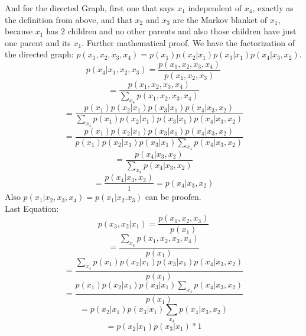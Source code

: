 And for the directed Graph, first one that says $x_1$ independent of $x_4$, exactly as the definition from above, and that $x_2$ and $x_3$ are the Markov blanket of $x_1$, because $x_1$ has 2 children and no other parents and also those children have just one parent and its $x_1$. 
Further mathematical proof. We have the factorization of the directed graph: $ p(x_1,x_2,x_3,x_4) = p(x_1)p(x_2|x_1)p(x_3|x_1)p(x_4|x_3, x_2)$.
$$p(x_4|x_1,x_2,x_3) = \frac{p(x_1,x_2,x_3,x_4)}{p(x_1,x_2,x_3)}$$
$$ = \frac{p(x_1,x_2,x_3,x_4)}{\sum_{x_4} p(x_1,x_2,x_3, x_4)}$$
$$ = \frac{p(x_1)p(x_2|x_1)p(x_3|x_1)p(x_4|x_3, x_2)}{\sum_{x_4}p(x_1)p(x_2|x_1)p(x_3|x_1)p(x_4|x_3, x_2)}$$
$$ = \frac{p(x_1)p(x_2|x_1)p(x_3|x_1)p(x_4|x_3, x_2)}{p(x_1)p(x_2|x_1)p(x_3|x_1)\sum_{x_4}p(x_4|x_3, x_2)}$$
$$ = \frac{p(x_4|x_3, x_2)}{\sum_{x_4}p(x_4|x_3, x_2)}$$
$$ = \frac{p(x_4|x_3, x_2)}{1} = p(x_4|x_3, x_2)$$
Also $p(x_1|x_2,x_3,x_4) = p(x_1|x_2.x_3)$ can be proofen.\\


Last  Equation: 
$$p(x_3, x_2| x_1) = \frac{p(x_1,x_2,x_3)}{p(x_1)}$$
$$= \frac{\sum_{x_4} p(x_1,x_2,x_3,x_4)}{p(x_1)}$$
$$= \frac{\sum_{x_4} p(x_1)p(x_2|x_1)p(x_3|x_1)p(x_4|x_3, x_2)}{p(x_1)}$$
$$= \frac{p(x_1)p(x_2|x_1)p(x_3|x_1)\sum_{x_4} p(x_4|x_3, x_2)}{p(x_1)}$$
$$= p(x_2|x_1)p(x_3|x_1)\sum_{x_4} p(x_4|x_3, x_2)$$
$$= p(x_2|x_1)p(x_3|x_1) * 1$$


















